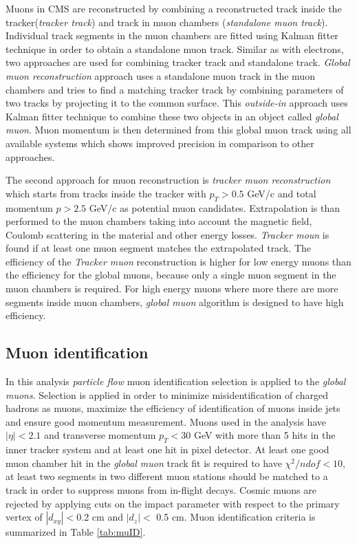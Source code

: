 Muons in CMS are reconstructed by combining a reconstructed track inside the tracker(\textit{tracker track}) and track in muon chambers (\textit{standalone muon track}). Individual track segments in the muon chambers are fitted using Kalman fitter technique \cite{Fruhwirth1987444}  in order to obtain a standalone muon track. Similar as with electrons, two approaches are used for combining tracker track and standalone track. \textit{Global muon reconstruction} approach uses a standalone muon track in the muon chambers and tries to find a matching tracker track by combining parameters of two tracks by projecting it to the common surface. This \textit{outside-in} approach uses Kalman fitter technique to combine these two objects in an object called \textit{global muon}. Muon momentum is then determined from this global muon track using all available systems which shows improved precision in comparison to other approaches.  
\par The second approach for muon reconstruction is \textit{tracker muon reconstruction} which starts from tracks inside the tracker with $p_T>0.5$ GeV/c and total momentum $p>2.5$ GeV/c as potential muon candidates. Extrapolation is than performed to the muon chambers taking into account the magnetic field, Coulomb scattering in the material and other energy losses. \textit{Tracker moun} is found if at least one muon segment matches the extrapolated track. The efficiency of the \textit{Tracker muon} reconstruction is higher for low energy muons than the efficiency for the global muons, because only a single muon segment in the muon chambers is required. For high energy muons where more there are more segments inside muon chambers, \textit{global muon} algorithm is designed to have high efficiency.    


\subsection{Muon identification}
\label{sec:muID}

In this analysis \textit{particle flow} muon identification selection is applied to the \textit{global muons}. Selection is applied in order to minimize misidentification of charged hadrons as muons, maximize the efficiency of identification of muons inside jets and ensure good momentum measurement. Muons used in the analysis have $|\eta|<2.1$ and transverse momentum $p_T<30$ GeV with more than 5 hits in the inner tracker system and at least one hit in pixel detector. At least one good muon chamber hit in the \textit{global muon} track fit is required to have $\chi^2/ndof<10$, at least two segments in two different muon stations should be matched to a track in order to suppress muons from in-flight decays. Cosmic muons are rejected by applying cuts on the impact parameter with respect to the primary vertex of $|d_{xy}|<$0.2 cm and $|d_z|<$ 0.5 cm. Muon identification criteria is summarized in Table \ref{tab:muID}.

